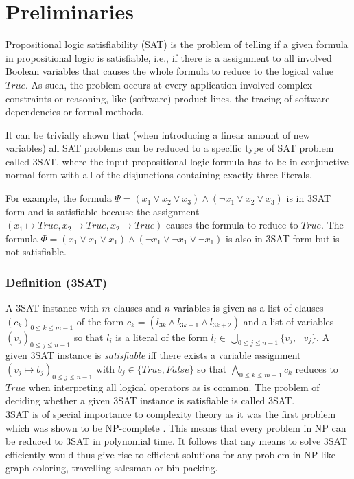 \section{Preliminaries}
\label{sec:preliminaries}

Propositional logic satisfiability (SAT) is the problem of telling if a given formula in propositional logic is satisfiable, i.e., if there is a assignment to all involved Boolean variables that causes the whole formula to reduce to the logical value $\textit{True}$. As such, the problem occurs at every application involved complex constraints or reasoning, like (software) product lines, the tracing of software dependencies or formal methods.

It can be trivially shown that (when introducing a linear amount of new variables) all SAT problems can be reduced to a specific type of SAT problem called 3SAT, where the input propositional logic formula has to be in conjunctive normal form with all of the disjunctions containing exactly three literals.

For example, the formula $\Psi = ( x_{1} \vee x_{2} \vee x_{3}) \wedge ( \lnot x_{1} \vee x_{2} \vee x_{3})$ is in 3SAT form and is satisfiable because the assignment $(x_1 \mapsto \textit{True}, x_2 \mapsto \textit{True}, x_2 \mapsto \textit{True})$ causes the formula to reduce to $\textit{True}$. The formula $\Phi = ( x_{1} \vee x_{1} \vee x_{1}) \wedge ( \lnot x_{1} \vee \lnot x_{1}  \vee \lnot x_{1} )$ is also in 3SAT form but is not satisfiable.

\subsubsection{Definition (3SAT)}
A 3SAT instance with $m$ clauses and $n$ variables is given as a list of clauses $(c_k)_{0 \leq k \leq m-1}$ of the form $c_k = (l_{3k} \land l_{3k+1} \land l_{3k+2})$ and a list of variables $(v_j)_{0 \leq j \leq n-1}$ so that $l_i$ is a literal of the form $l_i \in \bigcup_{0 \leq j \leq n-1} \{v_j, \lnot v_j\}$. A given 3SAT instance is \emph{satisfiable} iff there exists a variable assignment $(v_j \mapsto b_j)_{0 \leq j \leq n-1}$ with $b_j \in \{\textit{True}, \textit{False}\}$ so that $\bigwedge_{0 \leq k \leq m-1} c_k$ reduces to $\textit{True}$ when interpreting all logical operators as is common. The problem of deciding whether a given 3SAT instance is satisfiable is called 3SAT.\\

3SAT is of special importance to complexity theory as it was the first problem which was shown to be NP-complete \cite{cook1971complexity}. This means that every problem in NP can be reduced to 3SAT in polynomial time. It follows that any means to solve 3SAT efficiently would thus give rise to efficient solutions for any problem in NP like graph coloring, travelling salesman or bin packing.


